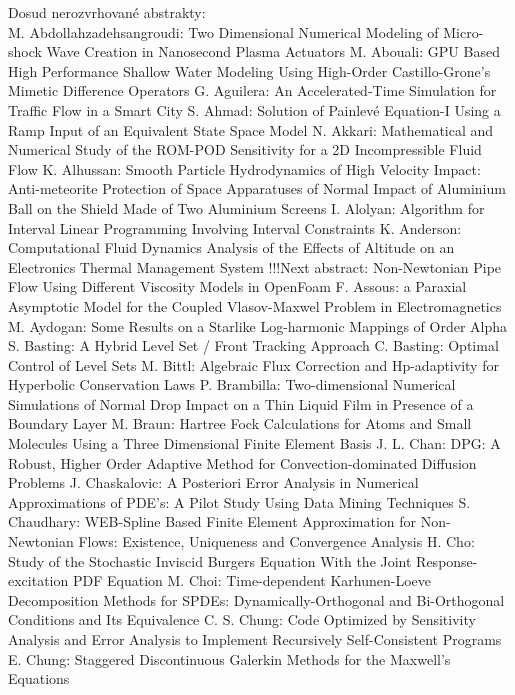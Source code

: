 \documentclass[10pt, A4]{article}%
\begin{document}
\newpage
Dosud nerozvrhované abstrakty:\\
{M. Abdollahzadehsangroudi}: {Two Dimensional Numerical Modeling of Micro-shock Wave Creation in Nanosecond Plasma Actuators}
{M. Abouali}: {GPU Based High Performance Shallow Water Modeling Using High-Order Castillo-Grone's Mimetic Difference Operators}
{G. Aguilera}: {An Accelerated-Time Simulation for Traffic Flow in a Smart City}
{S. Ahmad}: {Solution of Painlevé Equation-I Using a Ramp Input of an Equivalent State Space Model}
{N. Akkari}: {Mathematical and Numerical Study of the ROM-POD Sensitivity for a 2D Incompressible Fluid Flow}
{K. Alhussan}: {Smooth Particle Hydrodynamics of High Velocity Impact: Anti-meteorite Protection of Space Apparatuses of Normal Impact of Aluminium Ball on the Shield Made of Two Aluminium Screens}
{I. Alolyan}: {Algorithm for Interval Linear  Programming Involving Interval Constraints}
{K. Anderson}: {Computational Fluid Dynamics Analysis of the Effects of Altitude on an Electronics Thermal Management System       !!!Next abstract: Non-Newtonian Pipe Flow Using Different Viscosity Models in OpenFoam}
{F. Assous}: {a Paraxial Asymptotic Model for the Coupled Vlasov-Maxwel Problem in Electromagnetics}
{M. Aydogan}: {Some  Results on a Starlike  Log-harmonic Mappings of Order Alpha}
{S. Basting}: {A Hybrid Level Set / Front Tracking Approach}
{C. Basting}: {Optimal Control of Level Sets}
{M. Bittl}: {Algebraic Flux Correction and Hp-adaptivity for Hyperbolic Conservation Laws}
{P. Brambilla}: {Two-dimensional Numerical Simulations of Normal Drop Impact on a Thin Liquid Film in Presence of a Boundary Layer}
{M. Braun}: {Hartree Fock Calculations for Atoms and Small Molecules Using  a Three Dimensional  Finite Element Basis}
{J. L. Chan}: {DPG: A Robust, Higher Order Adaptive Method for Convection-dominated Diffusion Problems}
{J. Chaskalovic}: {A Posteriori Error Analysis in Numerical Approximations of PDE's: A Pilot Study Using Data Mining Techniques}
{S. Chaudhary}: {WEB-Spline Based Finite Element Approximation for Non-Newtonian Flows: Existence, Uniqueness and Convergence Analysis}
{H. Cho}: {Study of the Stochastic Inviscid Burgers Equation With the Joint Response-excitation PDF Equation}
{M. Choi}: {Time-dependent Karhunen-Loeve Decomposition Methods for SPDEs: Dynamically-Orthogonal and Bi-Orthogonal Conditions and Its Equivalence}
{C. S. Chung}: {Code Optimized by Sensitivity Analysis and Error Analysis to Implement Recursively Self-Consistent Programs}
{E. Chung}: {Staggered Discontinuous Galerkin Methods for the Maxwell's Equations}
\end{document}

